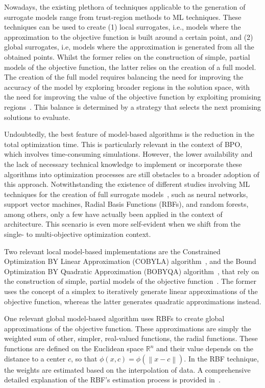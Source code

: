 	Nowadays, the existing plethora of techniques applicable to the generation of surrogate models range from trust-region methods to \ac{ML} techniques. These techniques can be used to create (1) local surrogates, i.e., models where the approximation to the objective function is built around a certain point, and (2) global surrogates, i.e, models where the approximation is generated from all the obtained points. Whilst the former relies on the construction of simple, partial models of the objective function, the latter relies on the creation of a full model. The creation of the full model requires balancing the need for improving the accuracy of the model by exploring broader regions in the solution space, with the need for improving the value of the objective function by exploiting promising regions~\cite{Koziel2011}. This balance is determined by a strategy that selects the next promising solutions to evaluate. 
	
	Undoubtedly, the best feature of model-based algorithms is the reduction in the total optimization time. This is particularly relevant in the context of \ac{BPO}, which involves time-consuming simulations. However, the lower availability and the lack of necessary technical knowledge to implement or incorporate these algorithms into optimization processes are still obstacles to a broader adoption of this approach. Notwithstanding the existence of different studies involving \ac{ML} techniques for the creation of full surrogate models~\cite{Koziel2011, Forrester2009SBO}, such as neural networks, support vector machines, Radial Basis Functions (RBFs), and random forests, among others, only a few have actually been applied in the context of architecture. This scenario is even more self-evident when we shift from the single- to multi-objective optimization context.
	
	Two relevant local model-based implementations are the Constrained Optimization BY Linear Approximation (COBYLA) algorithm~\cite{Powell1994COBYLA}, and the Bound Optimization BY Quadratic Approximation (BOBYQA) algorithm~\cite{Powell2009BOBYQA}, that rely on the construction of simple, partial models of the objective function~\cite{Koziel2011}. The former uses the concept of a simplex to iteratively generate linear approximations of the objective function, whereas the latter generates quadratic approximations instead. 
	
	One relevant global model-based algorithm uses RBFs to create global approximations of the objective function. These approximations are simply the weighted sum of other, simpler, real-valued functions, the radial functions. These functions are defined on the Euclidean space $\mathbb{R}^n$ and their value depends on the distance to a center $c$, so that $\phi(x, c) = \phi(\left\lVert x-c \right\rVert)$. In the RBF technique, the weights are estimated based on the interpolation of data. A comprehensive detailed explanation of the RBF's estimation process is provided in~\cite{Forrester2009SBO}. 
	
